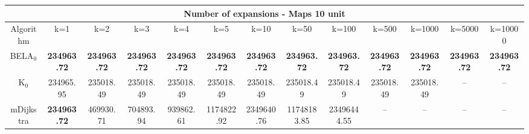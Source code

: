 \begin{tabular}{c|cccccccccccc}\toprule
\multicolumn{13}{c}{Number of expansions - Maps 10 unit}\\ \midrule
Algorithm & k=1 & k=2 & k=3 & k=4 & k=5 & k=10 & k=50 & k=100 & k=500 & k=1000 & k=5000 & k=10000 \\ \midrule
BELA$_0$ & \textbf{234963.72} & \textbf{234963.72} & \textbf{234963.72} & \textbf{234963.72} & \textbf{234963.72} & \textbf{234963.72} & \textbf{234963.72} & \textbf{234963.72} & \textbf{234963.72} & \textbf{234963.72} & \textbf{234963.72} & \textbf{234963.72} \\
K$_0$ & 234965.95 & 235018.49 & 235018.49 & 235018.49 & 235018.49 & 235018.49 & 235018.49 & 235018.49 & 235018.49 & 235018.49 & -- & -- \\
mDijkstra & \textbf{234963.72} & 469930.71 & 704893.94 & 939862.61 & 1174822.92 & 2349640.76 & 11748183.85 & 23496444.55 & -- & -- & -- & -- \\ \bottomrule 
\end{tabular}
